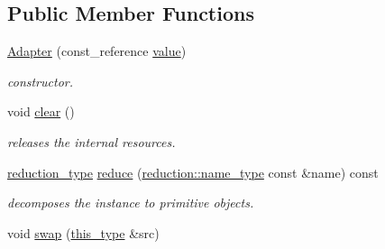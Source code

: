 \subsection*{Public Member Functions}
\begin{DoxyCompactItemize}
\item 
\hypertarget{classhryky_1_1http_1_1header_1_1field_1_1_adapter_a03728ea597524f9c0b91dfc65a3033b0}{\hyperlink{classhryky_1_1http_1_1header_1_1field_1_1_adapter_a03728ea597524f9c0b91dfc65a3033b0}{Adapter} (const\-\_\-reference \hyperlink{classhryky_1_1_adapter_ab736ecd30f215ca3cbd2364f818cb83f}{value})}\label{classhryky_1_1http_1_1header_1_1field_1_1_adapter_a03728ea597524f9c0b91dfc65a3033b0}

\begin{DoxyCompactList}\small\item\em constructor. \end{DoxyCompactList}\item 
\hypertarget{classhryky_1_1_adapter_adbdbd187b837f6782b776ca8aabd411b}{void \hyperlink{classhryky_1_1_adapter_adbdbd187b837f6782b776ca8aabd411b}{clear} ()}\label{classhryky_1_1_adapter_adbdbd187b837f6782b776ca8aabd411b}

\begin{DoxyCompactList}\small\item\em releases the internal resources. \end{DoxyCompactList}\item 
\hypertarget{classhryky_1_1_adapter_a42532b43ac680d162bbc1a2e3ebc6b99}{\hyperlink{namespacehryky_a343a9a4c36a586be5c2693156200eadc}{reduction\-\_\-type} \hyperlink{classhryky_1_1_adapter_a42532b43ac680d162bbc1a2e3ebc6b99}{reduce} (\hyperlink{namespacehryky_1_1reduction_ac686c30a4c8d196bbd0f05629a6b921f}{reduction\-::name\-\_\-type} const \&name) const}\label{classhryky_1_1_adapter_a42532b43ac680d162bbc1a2e3ebc6b99}

\begin{DoxyCompactList}\small\item\em decomposes the instance to primitive objects. \end{DoxyCompactList}\item 
\hypertarget{classhryky_1_1_adapter_ae95517793bc16f6ba623bc994bc17c43}{void \hyperlink{classhryky_1_1_adapter_ae95517793bc16f6ba623bc994bc17c43}{swap} (\hyperlink{classhryky_1_1http_1_1header_1_1field_1_1_adapter_ac0e236f0b00e87302473a0623441d22a}{this\-\_\-type} \&src)}\label{classhryky_1_1_adapter_ae95517793bc16f6ba623bc994bc17c43}


\end{DoxyCompactItemize}

